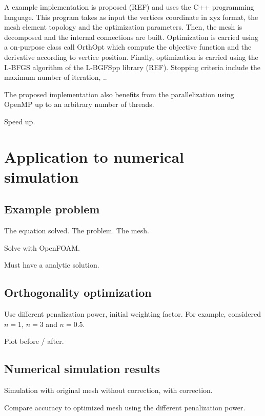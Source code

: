 \documentclass[11pt]{article}
\begin{document}
A example implementation is proposed (REF) and uses the C++ programming language. 
This program takes as input the vertices coordinate in xyz format, the mesh element topology and the optimization parameters. 
Then, the mesh is decomposed and the internal connections are built. Optimization is carried using a on-purpose class call OrthOpt which compute the objective function and the derivative according to vertice position. 
Finally, optimization is carried using the L-BFGS algorithm of the L-BGFSpp library (REF). Stopping criteria include the maximum number of iteration, ..

The proposed implementation also benefits from the parallelization using OpenMP up to an arbitrary number of threads. 

Speed up.



\section{Application to numerical simulation}

\subsection{Example problem}

The equation solved. The problem. The mesh.

Solve with OpenFOAM.

Must have a analytic solution. 

\subsection{Orthogonality optimization}

Use different penalization power, initial weighting factor. 
For example, considered $n=1$, $n=3$ and $n=0.5$.

Plot before / after.

\subsection{Numerical simulation results}

Simulation with original mesh without correction, with correction.

Compare accuracy to optimized mesh using the different penalization power.
\end{document}
